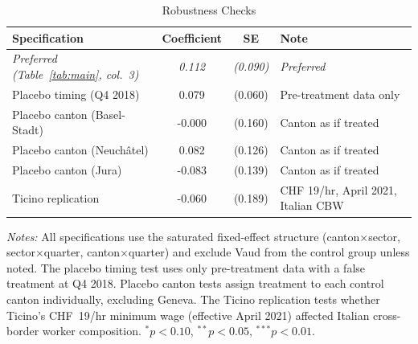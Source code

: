 \begin{table}[htbp]
\centering
\caption{Robustness Checks}
\label{tab:robustness}
\small
\begin{tabular}{lccl}
\toprule
Specification & Coefficient & SE & Note \\
\midrule
\textit{Preferred (Table~\ref{tab:main}, col.~3)} & \textit{0.112} & \textit{(0.090)} & \textit{Preferred} \\
\midrule
Placebo timing (Q4 2018) & 0.079 & (0.060) & Pre-treatment data only \\
Placebo canton (Basel-Stadt) & -0.000 & (0.160) & Canton as if treated \\
Placebo canton (Neuch\^atel) & 0.082 & (0.126) & Canton as if treated \\
Placebo canton (Jura) & -0.083 & (0.139) & Canton as if treated \\
Ticino replication & -0.060 & (0.189) & CHF 19/hr, April 2021, Italian CBW \\
\bottomrule
\end{tabular}
\begin{tablenotes}
\small
\item \textit{Notes:} All specifications use the saturated fixed-effect structure (canton$\times$sector, sector$\times$quarter, canton$\times$quarter) and exclude Vaud from the control group unless noted. The placebo timing test uses only pre-treatment data with a false treatment at Q4 2018. Placebo canton tests assign treatment to each control canton individually, excluding Geneva. The Ticino replication tests whether Ticino's CHF~19/hr minimum wage (effective April 2021) affected Italian cross-border worker composition. $^{*}p<0.10$, $^{**}p<0.05$, $^{***}p<0.01$.
\end{tablenotes}
\end{table}
